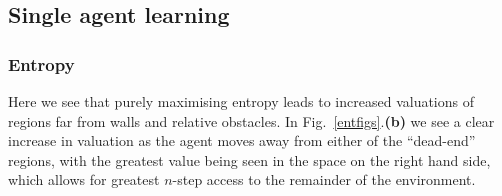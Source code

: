 \documentclass{article}
\begin{document}
\subsection{Single agent learning\label{singlesect}}
\subsubsection{Entropy \label{entres}}

Here we see that purely maximising entropy leads to increased valuations of regions far from walls and relative obstacles. In Fig.~\ref{entfigs}.\textbf{(b)} we see a clear increase in valuation as the agent moves away from either of the ``dead-end'' regions, with the greatest value being seen in the space on the right hand side, which allows for greatest $n$-step access to the remainder of the environment.
\end{document}
